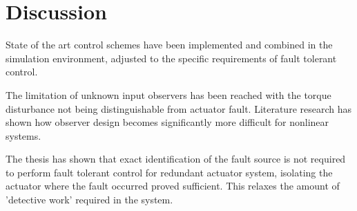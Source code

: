 \chapter{Discussion}

State of the art control schemes have been implemented and combined in the simulation environment, adjusted to the specific requirements of fault tolerant control.

The limitation of unknown input observers has been reached with the torque disturbance not being distinguishable from actuator fault. Literature research has shown how observer design becomes significantly more difficult for nonlinear systems.

The thesis has shown that exact identification of the fault source is not required to perform fault tolerant control for redundant actuator system, isolating the actuator where the fault occurred proved sufficient. This relaxes the amount of 'detective work' required in the system.